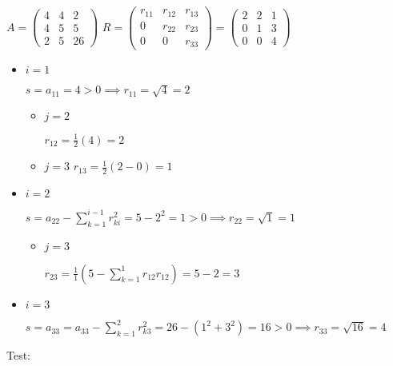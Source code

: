 \documentclass[a4paper,ngerman]{scrbook}
\begin{document}
$A =
\begin{pmatrix}
  4 & 4 & 2\\
  4 & 5 & 5\\
  2 & 5 & 26
\end{pmatrix}
$
$
  R =
  \begin{pmatrix}
    r_{11} & r_{12} & r_{13}\\
    0 & r_{22} & r_{23}\\
    0 & 0 & r_{33}
  \end{pmatrix} =
  \begin{pmatrix}
    2 & 2 & 1\\
    0 & 1 & 3\\
    0 & 0 & 4
  \end{pmatrix}
$
\begin{itemize}
\item $i=1$

    $s = a_{11} = 4 > 0 \implies r_{11} = \sqrt{4} = 2$
    \begin{itemize}
    \item $j=2$

      $r_{12} = \frac{1}{2}(4) = 2$
    \item $j=3$
      $r_{13} = \frac{1}{2}(2 - 0) = 1$
    \end{itemize}
  \item $i=2$

    $s = a_{22} - \sum_{k=1}^{i-1} r_{ki}^2 = 5 - 2^2 =1 > 0 \implies r_{22} = \sqrt{1} = 1$
\begin{itemize}
\item $j=3$

  $r_{23} = \frac{1}{1} (5 - \sum_{k=1}^1 r_{12} r_{12}) = 5 - 2 = 3$
\end{itemize}
\item $i=3$

  $s = a_{33} = a_{33} - \sum_{k=1}^{2} r_{k3}^2 = 26 - (1^2 + 3^2) = 16 > 0 \implies r_{33} = \sqrt{16} = 4$
\end{itemize}

Test:
\end{document}
